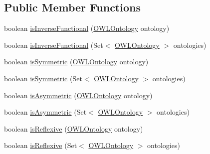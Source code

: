 \subsection*{Public Member Functions}
\begin{DoxyCompactItemize}
\item 
boolean \hyperlink{interfaceorg_1_1semanticweb_1_1owlapi_1_1model_1_1_o_w_l_object_property_expression_adc83a702b16fd496b777eb6c13de1035}{is\-Inverse\-Functional} (\hyperlink{interfaceorg_1_1semanticweb_1_1owlapi_1_1model_1_1_o_w_l_ontology}{O\-W\-L\-Ontology} ontology)
\item 
boolean \hyperlink{interfaceorg_1_1semanticweb_1_1owlapi_1_1model_1_1_o_w_l_object_property_expression_a869b03e92e084940ee3d640c8f3a0cb1}{is\-Inverse\-Functional} (Set$<$ \hyperlink{interfaceorg_1_1semanticweb_1_1owlapi_1_1model_1_1_o_w_l_ontology}{O\-W\-L\-Ontology} $>$ ontologies)
\item 
boolean \hyperlink{interfaceorg_1_1semanticweb_1_1owlapi_1_1model_1_1_o_w_l_object_property_expression_a3149f2c7086f2aeea2e743e38372b1e1}{is\-Symmetric} (\hyperlink{interfaceorg_1_1semanticweb_1_1owlapi_1_1model_1_1_o_w_l_ontology}{O\-W\-L\-Ontology} ontology)
\item 
boolean \hyperlink{interfaceorg_1_1semanticweb_1_1owlapi_1_1model_1_1_o_w_l_object_property_expression_ad09d16e93bd47bc558ecf7f8b807afaf}{is\-Symmetric} (Set$<$ \hyperlink{interfaceorg_1_1semanticweb_1_1owlapi_1_1model_1_1_o_w_l_ontology}{O\-W\-L\-Ontology} $>$ ontologies)
\item 
boolean \hyperlink{interfaceorg_1_1semanticweb_1_1owlapi_1_1model_1_1_o_w_l_object_property_expression_ac198cf038c5d6425bff8861b46a5fb25}{is\-Asymmetric} (\hyperlink{interfaceorg_1_1semanticweb_1_1owlapi_1_1model_1_1_o_w_l_ontology}{O\-W\-L\-Ontology} ontology)
\item 
boolean \hyperlink{interfaceorg_1_1semanticweb_1_1owlapi_1_1model_1_1_o_w_l_object_property_expression_a60ca5b4aaad08eeee7d3aad409bbc714}{is\-Asymmetric} (Set$<$ \hyperlink{interfaceorg_1_1semanticweb_1_1owlapi_1_1model_1_1_o_w_l_ontology}{O\-W\-L\-Ontology} $>$ ontologies)
\item 
boolean \hyperlink{interfaceorg_1_1semanticweb_1_1owlapi_1_1model_1_1_o_w_l_object_property_expression_a0ae33625f43acfaebe41844e9ecd15dd}{is\-Reflexive} (\hyperlink{interfaceorg_1_1semanticweb_1_1owlapi_1_1model_1_1_o_w_l_ontology}{O\-W\-L\-Ontology} ontology)
\item 
boolean \hyperlink{interfaceorg_1_1semanticweb_1_1owlapi_1_1model_1_1_o_w_l_object_property_expression_a077832775353c017f93fc6f1b2c2e6d6}{is\-Reflexive} (Set$<$ \hyperlink{interfaceorg_1_1semanticweb_1_1owlapi_1_1model_1_1_o_w_l_ontology}{O\-W\-L\-Ontology} $>$ ontologies)

\end{DoxyCompactItemize}

